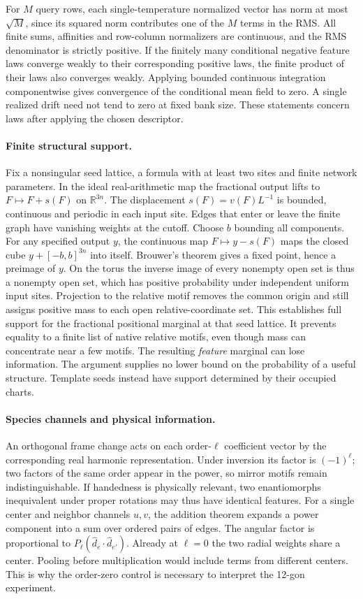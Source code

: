 For $M$ query rows, each single-temperature normalized vector has norm at most $\sqrt M$, since its squared norm contributes one of the $M$ terms in the RMS. All finite sums, affinities and row-column normalizers are continuous, and the RMS denominator is strictly positive. If the finitely many conditional negative feature laws converge weakly to their corresponding positive laws, the finite product of their laws also converges weakly. Applying bounded continuous integration componentwise gives convergence of the conditional mean field to zero. A single realized drift need not tend to zero at fixed bank size. These statements concern laws after applying the chosen descriptor.

\paragraph{Finite structural support.}
Fix a nonsingular seed lattice, a formula with at least two sites and finite network parameters. In the ideal real-arithmetic map the fractional output lifts to $F\mapsto F+s(F)$ on $\mathbb R^{3n}$. The displacement $s(F)=v(F)L^{-1}$ is bounded, continuous and periodic in each input site. Edges that enter or leave the finite graph have vanishing weights at the cutoff. Choose $b$ bounding all components. For any specified output $y$, the continuous map $F\mapsto y-s(F)$ maps the closed cube $y+[-b,b]^{3n}$ into itself. Brouwer's theorem gives a fixed point, hence a preimage of $y$. On the torus the inverse image of every nonempty open set is thus a nonempty open set, which has positive probability under independent uniform input sites. Projection to the relative motif removes the common origin and still assigns positive mass to each open relative-coordinate set. This establishes full support for the fractional positional marginal at that seed lattice. It prevents equality to a finite list of native relative motifs, even though mass can concentrate near a few motifs. The resulting \emph{feature} marginal can lose information. The argument supplies no lower bound on the probability of a useful structure. Template seeds instead have support determined by their occupied charts.

\paragraph{Species channels and physical information.}
An orthogonal frame change acts on each order-$\ell$ coefficient vector by the corresponding real harmonic representation. Under inversion its factor is $(-1)^\ell$; two factors of the same order appear in the power, so mirror motifs remain indistinguishable. If handedness is physically relevant, two enantiomorphs inequivalent under proper rotations may thus have identical features. For a single center and neighbor channels $u,v$, the addition theorem expands a power component into a sum over ordered pairs of edges. The angular factor is proportional to $P_\ell(\widehat d_e\cdot\widehat d_{e'})$. Already at $\ell=0$ the two radial weights share a center. Pooling before multiplication would include terms from different centers. This is why the order-zero control is necessary to interpret the 12-gon experiment.

